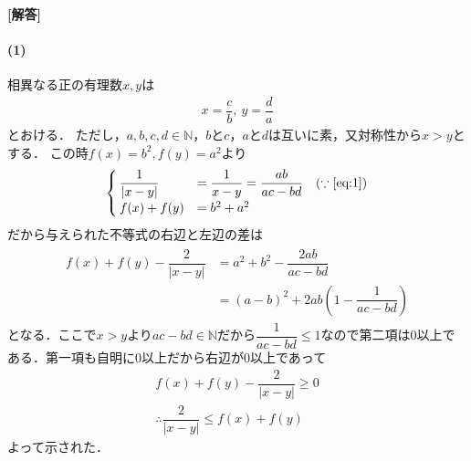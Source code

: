 \documentclass[../../main.tex]{subfiles}
\begin{document}
\begin{oframed}
  
\end{oframed}

{\bf [解答]}
\paragraph{(1)}
相異なる正の有理数$x,y$は
\begin{align}
  x=\dfrac{c}{b},\ y=\dfrac{d}{a} \label{eq:1}
\end{align}
とおける．
ただし，$a,b,c,d\in\mathbb{N}$，$b$と$c$，$a$と$d$は互いに素，又対称性から$x>y$とする．
この時$f(x)=b^2, f(y)=a^2$より
\begin{align}
  \begin{cases}
    \dfrac{1}{|x-y|}&=\dfrac{1}{x-y}=\dfrac{ab}{ac-bd} \quad(\because\text{\cref{eq:1}}) \\
    f(x)+f(y)&=b^2+a^2
  \end{cases}
\end{align}
だから与えられた不等式の右辺と左辺の差は
\begin{align}
  \begin{split}
    f(x)+f(y)-\dfrac{2}{|x-y|}
    &=a^2+b^2-\dfrac{2ab}{ac-bd} \\
    &=(a-b)^2+2ab\left(1-\dfrac{1}{ac-bd}\right)
  \end{split}
\end{align}
となる．ここで$x>y$より$ac-bd\in\mathbb{N}$だから$\dfrac{1}{ac-bd}\le 1$なので第二項は$0$以上である．第一項も自明に$0$以上だから右辺が$0$以上であって
\begin{align}
  f(x)+f(y)-\dfrac{2}{|x-y|} \ge 0 \\
  \therefore
  \dfrac{2}{|x-y|} \le f(x)+f(y)
\end{align}
よって示された．
\end{document}
